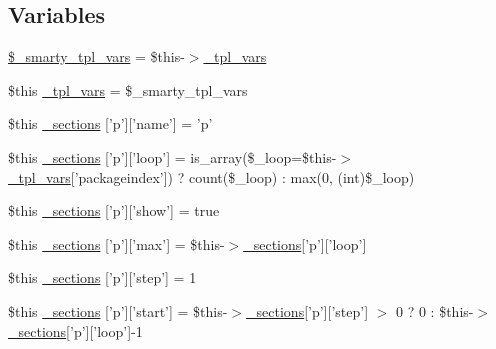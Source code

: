 \subsection*{\-Variables}
\begin{DoxyCompactItemize}
\item 
\hyperlink{_06_06127_05_06_0612781687_05pkgelementindex_8tpl_8php_a14dde6d029d65a879ee7bc1ebc398dd1}{\$\-\_\-smarty\-\_\-tpl\-\_\-vars} = \$this-\/$>$\hyperlink{_06_06127_05_06_0612781687_05pkgelementindex_8tpl_8php_a4a4846d8e68d455590131a05697f67a3}{\-\_\-tpl\-\_\-vars}
\item 
\$this \hyperlink{_06_06127_05_06_0612781687_05pkgelementindex_8tpl_8php_a4a4846d8e68d455590131a05697f67a3}{\-\_\-tpl\-\_\-vars} = \$\-\_\-smarty\-\_\-tpl\-\_\-vars
\item 
\$this \hyperlink{_06_06127_05_06_0612781687_05pkgelementindex_8tpl_8php_ac23b0b1d4f3c081e87a726b494bf863e}{\-\_\-sections} \mbox{[}'p'\mbox{]}\mbox{[}'name'\mbox{]} = 'p'
\item 
\$this \hyperlink{_06_06127_05_06_0612781687_05pkgelementindex_8tpl_8php_acf112e73369b5d57a5dd5027c069ef61}{\-\_\-sections} \mbox{[}'p'\mbox{]}\mbox{[}'loop'\mbox{]} = is\-\_\-array(\$\-\_\-loop=\$this-\/$>$\hyperlink{_06_06127_05_06_0612781687_05pkgelementindex_8tpl_8php_a4a4846d8e68d455590131a05697f67a3}{\-\_\-tpl\-\_\-vars}\mbox{[}'packageindex'\mbox{]}) ? count(\$\-\_\-loop) \-: max(0, (int)\$\-\_\-loop)
\item 
\$this \hyperlink{_06_06127_05_06_0612781687_05pkgelementindex_8tpl_8php_a59f101f9fd9747a4a1221916ee363795}{\-\_\-sections} \mbox{[}'p'\mbox{]}\mbox{[}'show'\mbox{]} = true
\item 
\$this \hyperlink{_06_06127_05_06_0612781687_05pkgelementindex_8tpl_8php_ab9459d9765bffe6e71f98da075f4db9c}{\-\_\-sections} \mbox{[}'p'\mbox{]}\mbox{[}'max'\mbox{]} = \$this-\/$>$\hyperlink{_06_06127_05_06_0612781687_05pkgelementindex_8tpl_8php_a9e3d26b39edfe29c3f29b8035ef33828}{\-\_\-sections}\mbox{[}'p'\mbox{]}\mbox{[}'loop'\mbox{]}
\item 
\$this \hyperlink{_06_06127_05_06_0612781687_05pkgelementindex_8tpl_8php_af0fe94b17f05601e226e298e84c30948}{\-\_\-sections} \mbox{[}'p'\mbox{]}\mbox{[}'step'\mbox{]} = 1
\item 
\$this \hyperlink{_06_06127_05_06_0612781687_05pkgelementindex_8tpl_8php_a6fedf9177032a51c081909aa685397f0}{\-\_\-sections} \mbox{[}'p'\mbox{]}\mbox{[}'start'\mbox{]} = \$this-\/$>$\hyperlink{_06_06127_05_06_0612781687_05pkgelementindex_8tpl_8php_a9e3d26b39edfe29c3f29b8035ef33828}{\-\_\-sections}\mbox{[}'p'\mbox{]}\mbox{[}'step'\mbox{]} $>$ 0 ? 0 \-: \$this-\/$>$\hyperlink{_06_06127_05_06_0612781687_05pkgelementindex_8tpl_8php_a9e3d26b39edfe29c3f29b8035ef33828}{\-\_\-sections}\mbox{[}'p'\mbox{]}\mbox{[}'loop'\mbox{]}-\/1

\end{DoxyCompactItemize}
